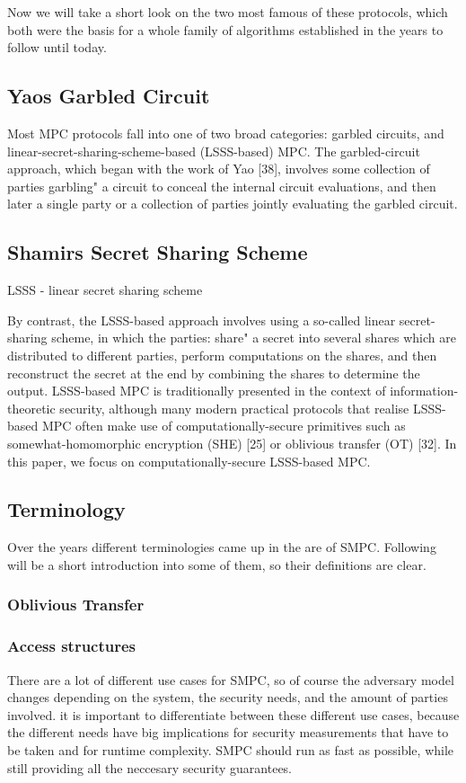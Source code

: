 \documentclass[english,runningheads,a4paper]{llncs}[2018/03/10]
\begin{document}
 Now we will take a short look on the two most famous of these protocols, which both were the basis for a whole family of algorithms established in the years to follow until today.

\subsection{Yaos Garbled Circuit}

Most MPC protocols fall into one of two broad categories: garbled circuits,
and linear-secret-sharing-scheme-based (LSSS-based) MPC. The garbled-circuit
approach, which began with the work of Yao [38], involves some collection of
parties garbling" a circuit to conceal the internal circuit evaluations, and then
later a single party or a collection of parties jointly evaluating the garbled circuit.

 
\subsection{Shamirs Secret Sharing Scheme}

LSSS - linear secret sharing scheme

By contrast, the LSSS-based approach involves using a so-called linear
secret-sharing scheme, in which the parties: share" a secret into several shares
which are distributed to different parties, perform computations on the shares,
and then reconstruct the secret at the end by combining the shares to determine
the output. LSSS-based MPC is traditionally presented in the context of
information-theoretic security, although many modern practical protocols that
realise LSSS-based MPC often make use of computationally-secure primitives
such as somewhat-homomorphic encryption (SHE) [25] or oblivious transfer
(OT) [32]. In this paper, we focus on computationally-secure LSSS-based MPC.


\subsection{Terminology}
Over the years different terminologies came up in the are of SMPC. Following will be a short introduction into some of them, so their definitions are clear.

\subsubsection{Oblivious Transfer}

\subsubsection{Access structures}
There are a lot of different use cases for SMPC, so of course the adversary model changes depending on the system, the security needs, and the amount of parties involved. it is important to differentiate between these different use cases, because the different needs have big implications for security measurements that have to be taken and for runtime complexity. SMPC should run as fast as possible, while still providing all the neccesary security guarantees.
\end{document}
